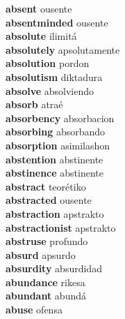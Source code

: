 \textbf{absent } ousente \\
\textbf{absentminded } ousente \\
\textbf{absolute } ilimitá \\
\textbf{absolutely } apsolutamente \\
\textbf{absolution } pordon \\
\textbf{absolutism } diktadura \\
\textbf{absolve } absolviendo \\
\textbf{absorb } atraé \\
\textbf{absorbency } absorbacion \\
\textbf{absorbing } absorbando \\
\textbf{absorption } asimilashon \\
\textbf{abstention } abstinente \\
\textbf{abstinence } abstinente \\
\textbf{abstract } teorétiko \\
\textbf{abstracted } ousente \\
\textbf{abstraction } apstrakto \\
\textbf{abstractionist } apstrakto \\
\textbf{abstruse } profundo \\
\textbf{absurd } apsurdo \\
\textbf{absurdity } absurdidad \\
\textbf{abundance } rikesa \\
\textbf{abundant } abundá \\
\textbf{abuse } ofensa \\
